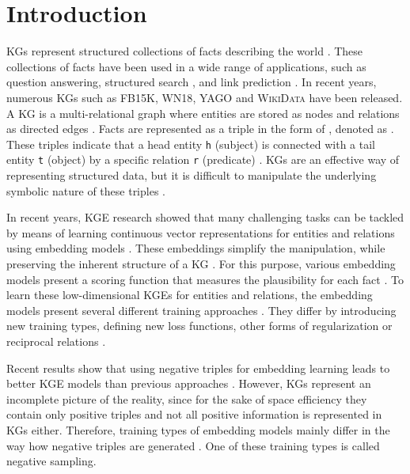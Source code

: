 \chapter{Introduction}
\label{ch:introduction}

\acp{KG} represent structured collections of facts describing the world  \cite{hogan2020knowledge}.
These collections of facts have been used in a wide range of applications, such as question answering, structured search \cite{zhang2019nscaching}, and link prediction \cite{cai2017kbgan, Alam2020AffinityDN}.
In recent years, numerous \acp{KG} such as \textsc{FB15K}, \textsc{WN18}, \textsc{YAGO} \cite{ConEx} and \textsc{WikiData} \cite{arnaoutwikinegata} have been released.
A \ac{KG} is a multi-relational graph where entities are stored as nodes and relations as directed edges \cite{zhang2019nscaching}.
Facts are represented as a triple in the form of , denoted as .
These triples indicate that a head entity \texttt{h} (subject) is connected with a tail entity \texttt{t} (object) by a specific relation \texttt{r} (predicate) \cite{zhang2019nscaching, Alam2020AffinityDN}.
\acp{KG} are an effective way of representing structured data, but it is difficult to manipulate the underlying symbolic nature of these triples \cite{8047276}.

In recent years, \ac{KGE} research showed that many challenging tasks can be tackled by means of learning continuous vector representations for entities and relations using embedding models \cite{Alam2020AffinityDN}.
These embeddings simplify the manipulation, while preserving the inherent structure of a \ac{KG} \cite{8047276}. 
For this purpose, various embedding models present a scoring function that measures the plausibility for each fact \cite{8047276, ConvE, qiannegative}.
To learn these low-dimensional \acp{KGE} for entities and relations, the embedding models present several different training approaches \cite{Ruffinelli2020You}.
They differ by introducing new training types, defining new loss functions, other forms of regularization or reciprocal relations \cite{Ruffinelli2020You}.

Recent results show that using negative triples for embedding learning leads to better \ac{KGE} models than previous approaches \cite{kotnis2017analysis}.
However, \acp{KG} represent an incomplete picture of the reality, since for the sake of space efficiency they contain only positive triples \cite{qiannegative} and not all positive information is represented in \acp{KG} either.
Therefore, training types of embedding models mainly differ in the way how negative triples are generated \cite{Ruffinelli2020You}. 
One of these training types is called negative sampling.
\clearpage

%

%

%

%
